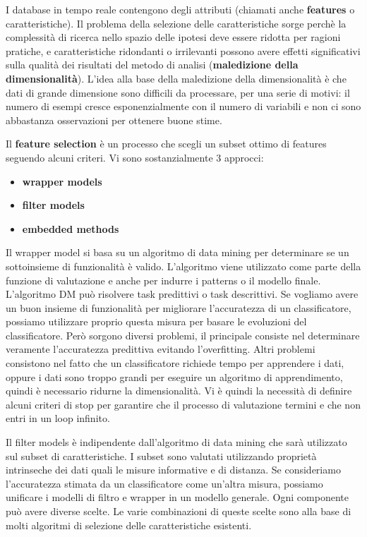 \documentclass[a4paper]{extarticle}
\begin{document}
I database in tempo reale contengono degli attributi (chiamati anche \textbf{features} o caratteristiche). Il problema della selezione delle caratteristiche sorge perchè la complessità di ricerca nello spazio delle ipotesi deve essere ridotta per ragioni pratiche, e caratteristiche ridondanti o irrilevanti possono avere effetti significativi sulla qualità dei risultati del metodo di analisi (\textbf{maledizione della dimensionalità}). L'idea alla base della maledizione della dimensionalità è che dati di grande dimensione sono difficili da processare, per una serie di motivi: il numero di esempi cresce esponenzialmente con il numero di variabili e non ci sono abbastanza osservazioni per ottenere buone stime.

Il \textbf{feature selection} è un processo che scegli un subset ottimo di features seguendo alcuni criteri. Vi sono sostanzialmente 3 approcci:
\begin{itemize}
\item \textbf{wrapper models}
\item \textbf{filter models}
\item \textbf{embedded methods}
\end{itemize}
Il wrapper model si basa su un algoritmo di data mining per determinare se un sottoinsieme di funzionalità è valido. L'algoritmo viene utilizzato come parte della funzione di valutazione e anche per indurre i patterns o il modello finale. L'algoritmo DM può risolvere task predittivi o task descrittivi. Se vogliamo avere un buon insieme di funzionalità per migliorare l'accuratezza di un classificatore, possiamo utilizzare proprio questa misura per basare le evoluzioni del classificatore. Però sorgono diversi problemi, il principale consiste nel determinare veramente l'accuratezza predittiva evitando l'overfitting. Altri problemi consistono nel fatto che un classificatore richiede tempo per apprendere i dati, oppure i dati sono troppo grandi per eseguire un algoritmo di apprendimento, quindi è necessario ridurne la dimensionalità. Vi è quindi la necessità di definire alcuni criteri di stop per garantire che il processo di valutazione termini e che non entri in un loop infinito.

Il filter models è indipendente dall'algoritmo di data mining che sarà utilizzato sul subset di caratteristiche. I subset sono valutati utilizzando proprietà intrinseche dei dati quali le misure informative e di distanza. Se consideriamo l'accuratezza stimata da un classificatore come un'altra misura, possiamo unificare i modelli di filtro e wrapper in un modello generale. Ogni componente può avere diverse scelte. Le varie combinazioni di queste scelte sono alla base di molti algoritmi di selezione delle caratteristiche esistenti.
\end{document}

